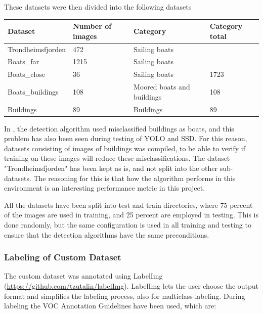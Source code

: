 \newpage

These datasets were then divided into the following datasets

\begin{table}[h!]
\begin{tabular}{l|l|l|l}
Dataset           & Number of images & Category                   & Category total \\ \hline
Trondheimsfjorden & 472              & Sailing boats              &                \\
Boats\_far        & 1215             & Sailing boats              &                \\
Boats\_close      & 36               & Sailing boats              & 1723           \\ \hline
Boats\_buildings  & 108              & Moored boats and buildings & 108            \\ \hline
Buildings         & 89               & Buildings                  & 89            
\end{tabular}
\end{table}

In \citep{Tangstad2017}, the detection algorithm used misclassified buildings as boats, and this problem has also been seen during testing of YOLO and SSD. For this reason, datasets consisting of images of buildings was compiled, to be able to verify if training on these images will reduce these misclassifications. The dataset "Trondheimsfjorden" has been kept as is, and not split into the other sub-datasets. The reasoning for this is that how the algorithm performs in this environment is an interesting performance metric in this project. 


\vspace{3mm}

All the datasets have been split into test and train directories, where 75 percent of the images are used in training, and 25 percent are employed in testing. This is done randomly, but the same configuration is used in all training and testing to ensure that the detection algorithms have the same preconditions.

\subsubsection{Labeling of Custom Dataset}
The custom dataset was annotated using LabelImg (\url{https://github.com/tzutalin/labelImg}). LabelImg lets the user choose the output format and simplifies the labeling process, also for multiclass-labeling. During labeling the VOC Annotation Guidelines \citep{Everingham2012} have been used, which are:


